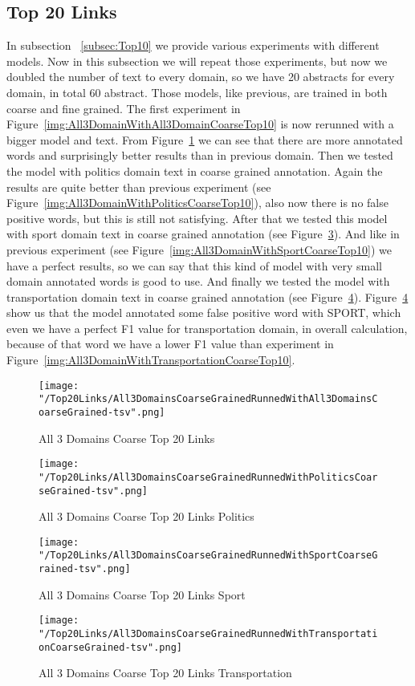 \documentclass[thesis=M,english]{FITthesis}[2018/05/30]
\begin{document}
\subsection{Top 20 Links}\label{subsec:Top20}
	In subsection ~\ref{subsec:Top10} we provide various experiments with different models. Now in this subsection we will repeat those experiments, but now we doubled the number of text to every domain, so we have 20 abstracts for every domain, in total 60 abstract. Those models, like previous, are trained in both coarse and fine grained.
	The first experiment in Figure~\ref{img:All3DomainWithAll3DomainCoarseTop10} is now rerunned with a bigger model and text. From Figure~\ref{img:All3DomainWithAll3DomainCoarseTop20} we can see that there are more annotated words and surprisingly better results than in previous domain.
	Then we tested the model with politics domain text in coarse grained annotation. Again the results are quite better than previous experiment (see Figure~\ref{img:All3DomainWithPoliticsCoarseTop10}), also now there is no false positive words, but this is still not satisfying.
	After that we tested this model with sport domain text in coarse grained annotation (see Figure~\ref{img:All3DomainWithSportCoarseTop20}). And like in previous experiment (see Figure~\ref{img:All3DomainWithSportCoarseTop10}) we have a perfect results, so we can say that this kind of model with very small domain annotated words is good to use.
	And finally we tested the model with transportation domain text in coarse grained annotation (see Figure~\ref{img:All3DomainWithTransportationCoarseTop20}). Figure~\ref{img:All3DomainWithTransportationCoarseTop20} show us that the model annotated some false positive word with SPORT, which even we have a perfect F1 value for transportation domain, in overall calculation, because of that word we have a lower F1 value than experiment in Figure~\ref{img:All3DomainWithTransportationCoarseTop10}.
	\begin{figure}[H]\centering
		\texttt{[image: "/Top20Links/All3DomainsCoarseGrainedRunnedWithAll3DomainsCoarseGrained-tsv".png]}
		\caption{All 3 Domains Coarse Top 20 Links}\label{img:All3DomainWithAll3DomainCoarseTop20}
	\end{figure}
	\begin{figure}[H]\centering
		\texttt{[image: "/Top20Links/All3DomainsCoarseGrainedRunnedWithPoliticsCoarseGrained-tsv".png]}
		\caption{All 3 Domains Coarse Top 20 Links Politics}\label{img:All3DomainWithPoliticstCoarseTop20}
	\end{figure}
	\begin{figure}[H]\centering
		\texttt{[image: "/Top20Links/All3DomainsCoarseGrainedRunnedWithSportCoarseGrained-tsv".png]}
		\caption{All 3 Domains Coarse Top 20 Links Sport}\label{img:All3DomainWithSportCoarseTop20}
	\end{figure}
	\begin{figure}[H]\centering
		\texttt{[image: "/Top20Links/All3DomainsCoarseGrainedRunnedWithTransportationCoarseGrained-tsv".png]}
		\caption{All 3 Domains Coarse Top 20 Links Transportation}\label{img:All3DomainWithTransportationCoarseTop20}	
	\end{figure}
	
\end{document}
